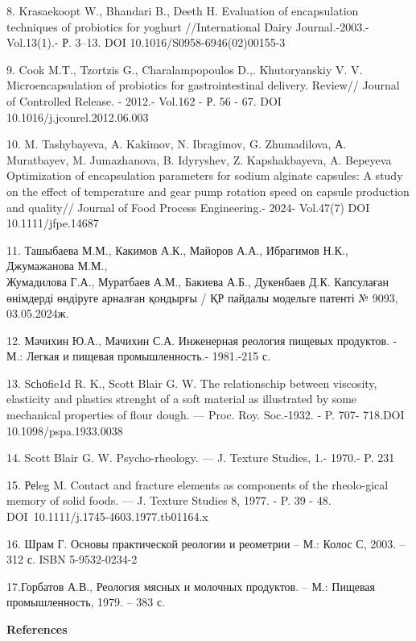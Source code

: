 \begin{noparindent}
8. Krasaekoopt W., Bhandari B., Deeth H. Evaluation of encapsulation
techniques of probiotics for yoghurt //International Dairy
Journal.-2003.- Vol.13(1).- Р. 3--13. DOI 10.1016/S0958-6946(02)00155-3

9. Cook M.T., Tzortzis G., Charalampopoulos D.,. Khutoryanskiy V. V.
Microencapsulation of probiotics for gastrointestinal delivery. Review//
Journal of Controlled Release. - 2012.- Vol.162 - Р. 56 - 67. DOI
10.1016/j.jconrel.2012.06.003

10. M. Tashybayeva, A. Kakimov, N. Ibragimov, G. Zhumadilova, А.
Muratbayev, M. Jumazhanova, B. Idyryshev, Z. Kapshakbayeva, A. Bepeyeva
Optimization of encapsulation parameters for sodium alginate capsules: A
study on the effect of temperature and gear pump rotation speed on
capsule production and quality// Journal of Food Process Engineering.-
2024- Vol.47(7) DOI 10.1111/jfpe.14687

11. Ташыбаева М.М., Какимов А.К., Майоров А.А., Ибрагимов Н.К.,
Джумажанова М.М., \\Жумадилова Г.А., Муратбаев А.М., Бакиева А.Б.,
Дукенбаев Д.К. Капсулаған өнімдерді өндіруге арналған қондырғы / ҚР
пайдалы модельге патенті № 9093, 03.05.2024ж.

12. Мачихин Ю.А., Мачихин С.А. Инженерная реология пищевых продуктов. -
М.: Легкая и пищевая промышленность.- 1981.-215 с.

13. Sсhоfie1d R. K., Scott Blair G. W. The relationschip between
viscosity, elasticity and plastics strenght of a soft material as
illustrated by some mechanical properties of flour dough. --- Proc. Roy.
Soc.-1932. - P. 707- 718.DOI 10.1098/pspa.1933.0038

14. Scott Blair G. W. Psycho-rheology. --- J. Texture Studies, 1.-
1970.- P. 231

15. Реleg M. Contact and fracture elements as components of the
rheolo-gical memory of solid foods. --- J. Texture Studies 8, 1977. - P.
39 - 48. DOI~10.1111/j.1745-4603.1977.tb01164.x

16. Шрам Г. Основы практической реологии и реометрии -- М.: Колос С,
2003. -- 312 с. ISBN 5-9532-0234-2

17.Горбатов А.В., Реология мясных и молочных продуктов. -- М.: Пищевая
промышленность, 1979. -- 383 с.

\end{noparindent}

\begin{center}
{\bfseries References}
\end{center}

